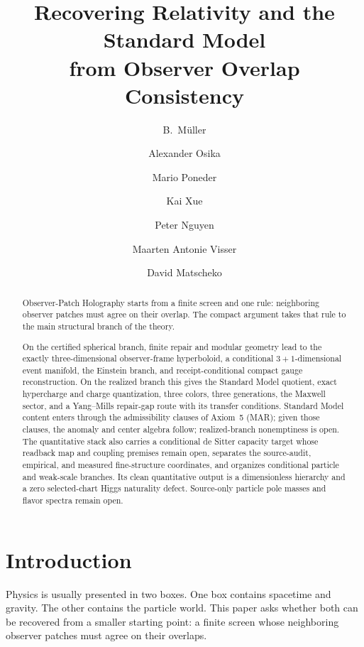 \documentclass[11pt]{article}
\title{Recovering Relativity and the Standard Model\\
from Observer Overlap Consistency}
\author{B.\ M\"uller \and Alexander Osika \and Mario Poneder \and Kai Xue \and Peter Nguyen \and Maarten Antonie Visser \and David Matscheko}
\date{\OPHPaperReleaseDate}
\begin{document}
\maketitle
\OPHPaperReleaseBanner

\begin{abstract}
Observer-Patch Holography starts from a finite screen and one rule: neighboring observer patches must agree on their overlap. The compact argument takes that rule to the main structural branch of the theory.

On the certified spherical branch, finite repair and modular geometry lead to
the exactly three-dimensional observer-frame hyperboloid, a conditional
\(3{+}1\)-dimensional event manifold, the Einstein branch, and receipt-conditional
compact gauge reconstruction. On the realized branch this gives the Standard Model quotient,
exact hypercharge and charge quantization, three colors, three generations, the
Maxwell sector, and a Yang--Mills repair-gap route with its transfer
conditions. Standard Model content enters through the admissibility clauses of
Axiom~5 (MAR); given those clauses, the anomaly and center algebra follow;
realized-branch nonemptiness is open. The quantitative stack also carries a conditional de Sitter
capacity target whose readback map and coupling premises remain open, separates the source-audit,
empirical, and measured fine-structure
coordinates, and organizes conditional particle and weak-scale branches.  Its
clean quantitative output is a dimensionless hierarchy and a zero selected-chart
Higgs naturality defect. Source-only particle pole masses and flavor spectra
remain open.
\end{abstract}

\section{Introduction}

Physics is usually presented in two boxes. One box contains spacetime and gravity. The other contains the particle world. This paper asks whether both can be recovered from a smaller starting point: a finite screen whose neighboring observer patches must agree on their overlaps.
\end{document}
